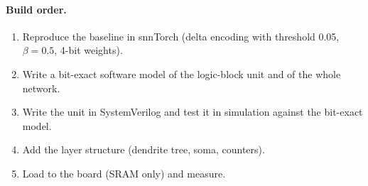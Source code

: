 \paragraph{Build order.}
\begin{enumerate}[leftmargin=1.5em]
\item Reproduce the baseline in snnTorch (delta encoding with threshold 0.05, $\beta=0.5$, 4-bit weights).
\item Write a bit-exact software model of the logic-block unit and of the whole network.
\item Write the unit in SystemVerilog and test it in simulation against the bit-exact model.
\item Add the layer structure (dendrite tree, soma, counters).
\item Load to the board (SRAM only) and measure.
\end{enumerate}
